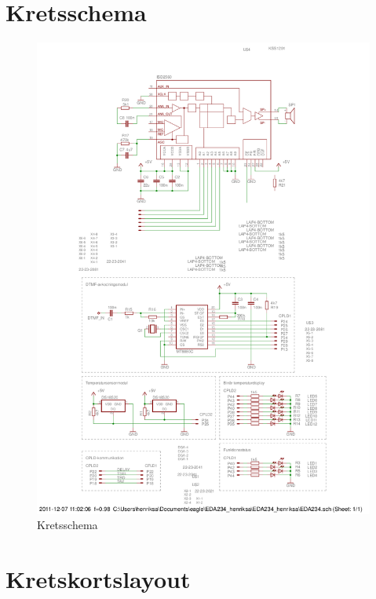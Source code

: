 \documentclass[a4paper,11pt]{article}
\begin{document}
	\section{Kretsschema}
		\label{sec:kretsschema}
		\begin{figure}[H]
		  \centering
		      \includegraphics[scale=0.65, angle=90]{schema.png}
		  	\caption{Kretsschema}
		  	\label{fig:schema}
		\end{figure}

	\section{Kretskortslayout}
\end{document}
